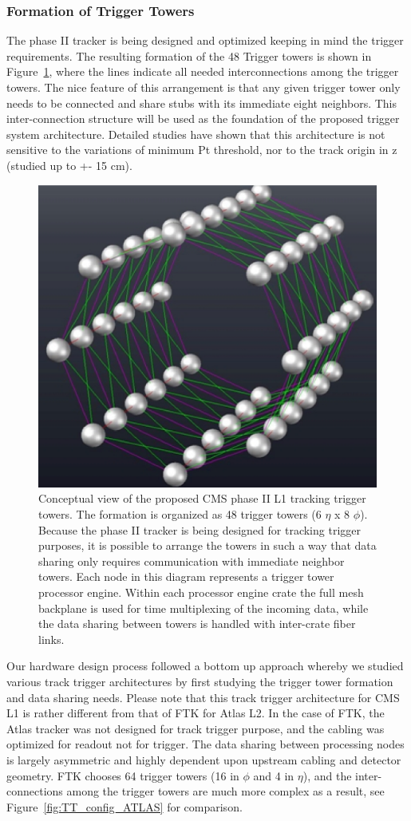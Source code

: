 \subsubsection{Formation of Trigger Towers}

\noindent The phase II tracker is being designed and optimized keeping in mind the trigger requirements. The resulting formation of the 48 Trigger towers is shown in Figure~\ref{fig:TT_config}, where the lines indicate all needed interconnections among the trigger towers. The nice feature of this arrangement is that any given trigger tower only needs to be connected and share stubs with its immediate eight neighbors. This inter-connection structure will be used as the foundation of the proposed trigger system architecture. Detailed studies have shown that this architecture is not sensitive to the variations of minimum Pt threshold, nor to the track origin in z (studied up to +- 15 cm).

\begin{figure}[ht!]
\centering
\includegraphics[width=0.6\columnwidth]{Plots/TT_config.eps}
\caption{Conceptual view of the proposed CMS phase II L1 tracking trigger towers.  The formation is organized as 48 trigger towers (6 $\eta$ x 8 $\phi$).  Because the phase II tracker is being designed for tracking trigger purposes, it is possible to arrange the towers in such a way that data sharing only requires communication with immediate neighbor towers.  Each node in this diagram represents a trigger tower processor engine.  Within each processor engine crate the full mesh backplane is used for time multiplexing of the incoming data, while the data sharing between towers is handled with inter-crate fiber links.}
\label{fig:TT_config}
\end{figure}

\noindent Our hardware design process followed a bottom up approach whereby we studied various track trigger architectures by first studying the trigger tower formation and data sharing needs. Please note that this track trigger architecture for CMS L1 is rather different from that of FTK for Atlas L2. In the case of FTK, the Atlas tracker was not designed for track trigger purpose, and the cabling was optimized for readout not for trigger. The data sharing between processing nodes is largely asymmetric and highly dependent upon upstream cabling and detector geometry. FTK chooses 64 trigger towers (16 in $\phi$ and 4 in $\eta$), and the inter-connections among the trigger towers are much more complex as a result, see Figure~\ref{fig:TT_config_ATLAS} for comparison. 

